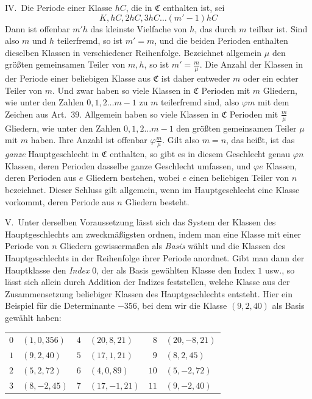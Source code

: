 IV.\ Die Periode einer Klasse \(hC\), die in \(\mathfrak C\) enthalten ist, sei
\[K,hC,2hC,3hC\ldots(m'-1)hC\]
Dann ist offenbar \(m'h\) das kleinste Vielfache von \(h\), das durch \(m\) teilbar ist. Sind also \(m\) und \(h\) teilerfremd, so ist \(m'=m\), und die beiden Perioden enthalten dieselben Klassen in verschiedener Reihenfolge. Bezeichnet allgemein \(\mu\) den größten gemeinsamen Teiler von \(m,h\), so ist \(m'=\frac m\mu\). Die Anzahl der Klassen in der Periode einer beliebigen Klasse aus \(\mathfrak C\) ist daher entweder \(m\) oder ein echter Teiler von \(m\). Und zwar haben so viele Klassen in \(\mathfrak C\) Perioden mit \(m\) Gliedern, wie unter den Zahlen \(0,1,2\ldots m-1\) zu \(m\) teilerfremd sind, also \(\varphi m\) mit dem Zeichen aus Art.\ \(39\). Allgemein haben so viele Klassen in \(\mathfrak C\) Perioden mit \(\frac m\mu\) Gliedern, wie unter den Zahlen \(0,1,2\ldots m-1\) den größten gemeinsamen Teiler \(\mu\) mit \(m\) haben. Ihre Anzahl ist offenbar \(\varphi\frac m\mu\). Gilt also \(m=n\), das heißt, ist das \textit{ganze} Hauptgeschlecht in \(\mathfrak C\) enthalten, so gibt es in diesem Geschlecht genau \(\varphi n\) Klassen, deren Perioden dasselbe ganze Geschlecht umfassen, und \(\varphi e\) Klassen, deren Perioden aus \(e\) Gliedern bestehen, wobei \(e\) einen beliebigen Teiler von \(n\) bezeichnet. Dieser Schluss gilt allgemein, wenn im Hauptgeschlecht eine Klasse vorkommt, deren Periode aus \(n\) Gliedern besteht.

V.\ Unter derselben Voraussetzung lässt sich das System der Klassen des Hauptgeschlechts am zweckmäßigsten ordnen, indem man eine Klasse mit einer Periode von \(n\) Gliedern gewissermaßen als \textit{Basis} wählt und die Klassen des Hauptgeschlechts in der Reihenfolge ihrer Periode anordnet. Gibt man dann der Hauptklasse den \textit{Index} \(0\), der als Basis gewählten Klasse den Index \(1\) usw., so lässt sich allein durch Addition der Indizes feststellen, welche Klasse aus der Zusammensetzung beliebiger Klassen des Hauptgeschlechts entsteht. Hier ein Beispiel für die Determinante \(-356\), bei dem wir die Klasse \((9,2,40)\) als Basis gewählt haben:
\begin{center}\begin{tabular}{rl|rl|rl}
\(0\) & \((1,0,356)\) & \(4\) & \((20,8,21)\) & \(8\) & \((20,-8,21)\)\\[2pt]
\(1\) & \((9,2,40)\) & \(5\) & \((17,1,21)\) & \(9\) & \((8,2,45)\)\\[2pt]
\(2\) & \((5,2,72)\) & \(6\) & \((4,0,89)\) & \(10\) & \((5,-2,72)\)\\[2pt]
\(3\) & \((8,-2,45)\) & \(7\) & \((17,-1,21)\) & \(11\) & \((9,-2,40)\)\\[2pt]
\end{tabular}\end{center}

